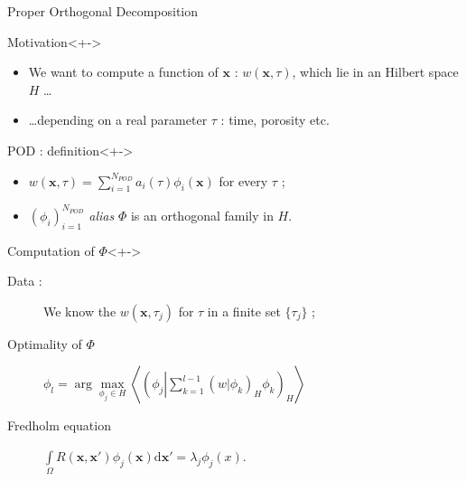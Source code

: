 
\begin{frame}{Proper Orthogonal Decomposition}
%
\begin{block}{Motivation}<+->
%
\begin{itemize}
\item<+-> We want to compute a function of $\mathbf{x}$ : $w(\mathbf{x},\tau)$, which lie in an Hilbert space $H$ \dots
\item<+-> \dots depending on a real parameter $\tau$ : time, porosity etc.
\end{itemize}
%
\end{block}
%
\begin{block}{POD : definition}<+->
\begin{itemize}
\item %
$w(\mathbf{x},\tau)=\sum\limits_{i=1}^{N_{POD}} a_i(\tau)\phi_i(\mathbf{x})$ for every $\tau$ ;
\item %
$(\phi_i)_{i=1}^{N_{POD}}$ \emph{alias} $\Phi$ is an orthogonal family in $H$.
\end{itemize}
\end{block}
%
\begin{block}{Computation of $\Phi$}<+->
\begin{description}
\item %
[Data :] We know the $w(\mathbf{x},\tau_j)$ for $\tau$ in a finite set $\{\tau_j\}$ ;
\item %
[Optimality of $\Phi$] $\phi_l= \arg\max\limits_{\phi_j\in H}\left\langle\left(\phi_j\left|\sum\limits_{k=1}^{l-1}\left(w|\phi_k\right)_H\phi_k\right.\right)_H\right\rangle$%
\item %
[Fredholm equation] $\int\limits_{\Omega}R(\mathbf{x},\mathbf{x'})\phi_j (\mathbf{x})\text{d}\mathbf{x'}=\lambda_j \phi_j (x)$.
\end{description}
\end{block}
%
\end{frame}

